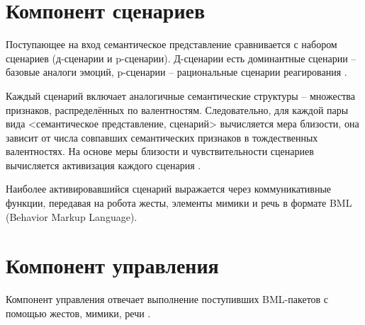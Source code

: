 \clearpage

\section{Компонент сценариев}

Поступающее на вход семантическое представление сравнивается с набором сценариев (д-сценарии и p-сценарии). Д-сценарии есть доминантные сценарии -- базовые аналоги эмоций, p-сценарии -- рациональные сценарии реагирования \cite{arch_of_the_robot_4}. 

Каждый сценарий включает аналогичные семантические структуры -- множества признаков, распределённых по валентностям. Следовательно, для каждой пары вида <семантическое представление, сценарий> вычисляется мера близости, она зависит от числа совпавших семантических признаков в тождественных валентностях. На основе меры близости и чувствительности сценариев вычисляется активизация каждого сценария \cite{arch_of_the_robot_5}.

Наиболее активировавшийся сценарий выражается через коммуникативные функции, передавая на робота жесты, элементы мимики и речь в формате BML (Behavior Markup Language).

\section{Компонент управления}

Компонент управления отвечает выполнение поступивших BML-пакетов с помощью жестов, мимики, речи \cite{arch_of_the_robot}.
